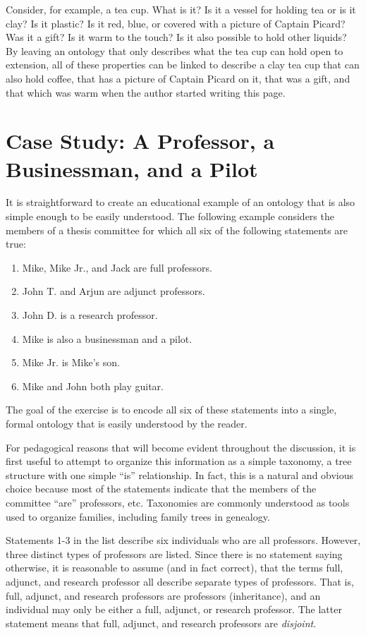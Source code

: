 Consider, for example, a tea cup. What is it? Is it a vessel for holding tea or
is it clay? Is it plastic? Is it red, blue, or covered with a picture of
Captain Picard? Was it a gift? Is it warm to the touch? Is it also possible to
hold other liquids? By leaving an ontology that only describes what the tea cup
can hold open to extension, all of these properties can be linked to describe a
clay tea cup that can also hold coffee, that has a picture of Captain Picard on
it, that was a gift, and that which was warm when the author started writing
this page.

\section{Case Study: A Professor, a Businessman, and a Pilot}
\label{case-study}

It is straightforward to create an educational example of an ontology that is
also simple enough to be easily understood. The following example
considers the members of a thesis committee for which all six of the following
statements are true:

\begin{enumerate}
\item Mike, Mike Jr., and Jack are full professors. %
\item John T. and Arjun are adjunct professors.     %
\item John D. is a research professor.              %
\item Mike is also a businessman and a pilot.       %
\item Mike Jr. is Mike's son.                       %
\item Mike and John both play guitar.               %
\end{enumerate}
The goal of the exercise is to encode all six of these statements into a single,
formal ontology that is easily understood by the reader.

For pedagogical reasons that will become evident throughout the discussion, it
is first useful to attempt to organize this information as a simple taxonomy, a
tree structure with one simple ``is'' relationship. In fact, this is a natural
and obvious choice because most of the statements indicate that the members of
the committee ``are'' professors, etc. Taxonomies are commonly understood as
tools used to organize families, including family trees in genealogy.

Statements 1-3 in the list describe six individuals who are all professors.
However, three distinct types of professors are listed. Since there is no
statement saying otherwise, it is reasonable to assume (and in fact correct),
that the terms full, adjunct, and research professor all describe separate types
of professors. That is, full, adjunct, and research professors are professors
(inheritance), and an individual may only be either a full, adjunct, or research
professor. The latter statement means that full, adjunct, and research
professors are \textit{disjoint}. 

